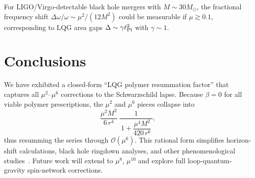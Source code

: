 \documentclass[11pt]{article}
\begin{document}
For LIGO/Virgo-detectable black hole mergers with $M \sim 30 M_{\odot}$, the fractional frequency shift $\Delta\omega/\omega \sim \mu^2/(12M^2)$ could be measurable if $\mu \gtrsim 0.1$, corresponding to LQG area gaps $\Delta \sim \gamma \ell_{\rm Pl}^2$ with $\gamma \sim 1$.

\section{Conclusions}

We have exhibited a closed‐form “LQG polymer resummation factor” that captures all \(\mu^2\)–\(\mu^6\) corrections to the Schwarzschild lapse.  Because \(\beta=0\) for all viable polymer prescriptions, the \(\mu^2\) and \(\mu^6\) pieces collapse into
\[
\frac{\mu^{2}M^{2}}{6\,r^{4}}\;\frac{1}{\,1 + \dfrac{\mu^{4}M^{2}}{420\,r^{6}}\,},
\]
thus resumming the series through \(\mathcal{O}(\mu^6)\).  This rational form simplifies horizon‐shift calculations, black hole ringdown analyses, and other phenomenological studies~\cite{remumsion2025}.  Future work will extend to \(\mu^8\), \(\mu^{10}\) and explore full loop‐quantum‐gravity spin‐network corrections.
\end{document}
